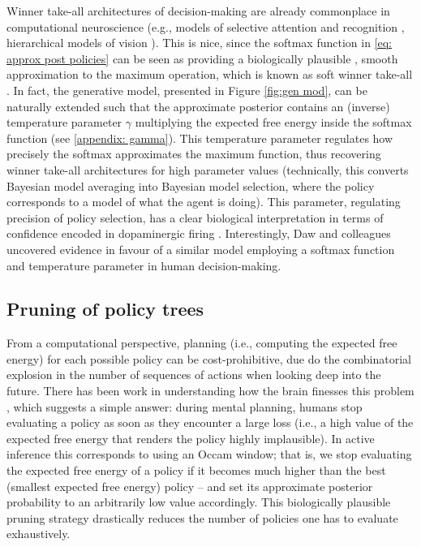 \documentclass[review,12pt,authoryear]{elsarticle}
\begin{document}
Winner take-all architectures of decision-making are already commonplace in computational neuroscience (e.g., models of selective attention and recognition \citep{carpenterMassivelyParallelArchitecture1987,ittiModelSaliencybasedVisual1998}, hierarchical models of vision \citep{riesenhuberHierarchicalModelsObject1999}).
This is nice, since the softmax function in \eqref{eq: approx post policies} can be seen as providing a biologically plausible \citep{marreirosPopulationDynamicsVariance2008,decoDynamicBrainSpiking2008,moranNeuralMassesFields2013}, smooth approximation to the maximum operation, which is known as soft winner take-all \citep{maassComputationalPowerWinnerTakeAll2000}. In fact, the generative model, presented in Figure \ref{fig:gen mod}, can be naturally extended such that the approximate posterior contains an (inverse) temperature parameter $\gamma$ multiplying the expected free energy inside the softmax function (see \ref{appendix: gamma}). This temperature parameter regulates how precisely the softmax approximates the maximum function, thus recovering winner take-all architectures for high parameter values (technically, this converts Bayesian model averaging into Bayesian model selection, where the policy corresponds to a model of what the agent is doing). This parameter, regulating precision of policy selection, has a clear biological interpretation in terms of confidence encoded in dopaminergic firing \citep{fitzgeraldDopamineRewardLearning2015,fristonAnatomyChoiceDopamine2014,schwartenbeckDopaminergicMidbrainEncodes2015,fristonActiveInferenceProcess2017}. Interestingly, Daw and colleagues \citep{dawCorticalSubstratesExploratory2006} uncovered evidence in favour of a similar model employing a softmax function and temperature parameter in human decision-making.

\subsection{Pruning of policy trees}

From a computational perspective, planning (i.e., computing the expected free energy) for each possible policy can be cost-prohibitive, due do the combinatorial explosion in the number of sequences of actions when looking deep into the future. There has been work in understanding how the brain finesses this problem \citep{huysBonsaiTreesYour2012}, which suggests a simple answer: during mental planning, humans stop evaluating a policy as soon as they encounter a large loss (i.e., a high value of the expected free energy that renders the policy highly implausible). In active inference this corresponds to using an Occam window; that is, we stop evaluating the expected free energy of a policy if it becomes much higher than the best (smallest expected free energy) policy -- and set its approximate posterior probability to an arbitrarily low value accordingly. This biologically plausible pruning strategy drastically reduces the number of policies one has to evaluate exhaustively.
\end{document}
